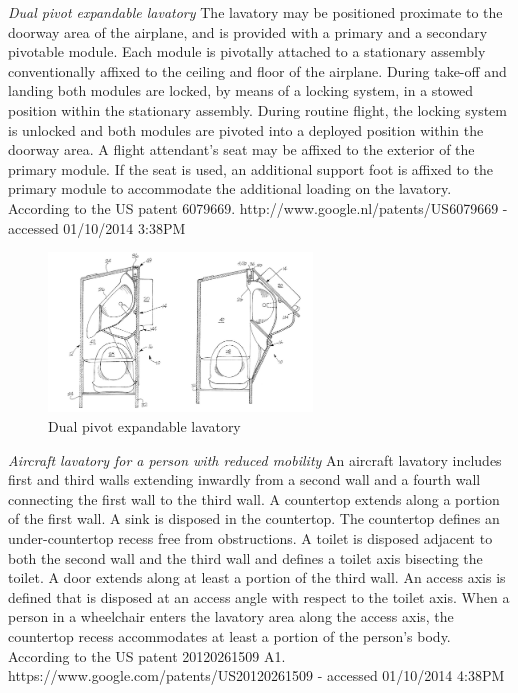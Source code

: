 \emph{Dual pivot expandable lavatory} The lavatory may be positioned proximate to the doorway area of the airplane, and is provided with a primary and a secondary pivotable module. Each module is pivotally attached to a stationary assembly conventionally affixed to the ceiling and floor of the airplane. During take-off and landing both modules are locked, by means of a locking system, in a stowed position within the stationary assembly. During routine flight, the locking system is unlocked and both modules are pivoted into a deployed position within the doorway area. A flight attendant's seat may be affixed to the exterior of the primary module. If the seat is used, an additional support foot is affixed to the primary module to accommodate the additional loading on the lavatory. According to the US patent 6079669. 
http://www.google.nl/patents/US6079669 - accessed 01/10/2014 3:38PM

\begin{figure}[h]
\centering
\includegraphics[width=7cm]{brazil_images/image016.png}
\caption{Dual pivot expandable lavatory}
\label{fig:expandable_lavatory}
\end{figure}


\emph{Aircraft lavatory for a person with reduced mobility} An aircraft lavatory includes first and third walls extending inwardly from a second wall and a fourth wall connecting the first wall to the third wall. A countertop extends along a portion of the first wall. A sink is disposed in the countertop. The countertop defines an under-countertop recess free from obstructions. A toilet is disposed adjacent to both the second wall and the third wall and defines a toilet axis bisecting the toilet. A door extends along at least a portion of the third wall. An access axis is defined that is disposed at an access angle with respect to the toilet axis. When a person in a wheelchair enters the lavatory area along the access axis, the countertop recess accommodates at least a portion of the person's body. According to the US patent 20120261509 A1. 
https://www.google.com/patents/US20120261509 - accessed 01/10/2014 4:38PM


